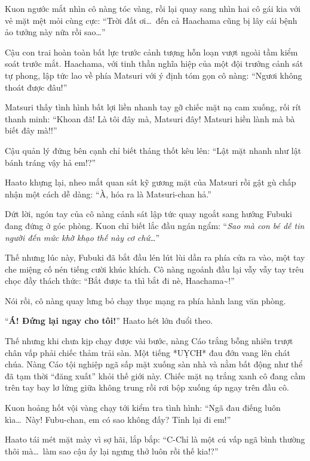 \documentclass[../main.tex]{subfiles}
\begin{document}
Kuon ngước mắt nhìn cô nàng tóc vàng, rồi lại quay sang nhìn hai cô gái kia với vẻ mặt mệt mỏi cùng cực: ``Trời đất ơi\dots\ đến cả Haachama cũng bị lây cái bệnh ảo tưởng này nữa rồi sao\dots''


Cậu con trai hoàn toàn bất lực trước cảnh tượng hỗn loạn vượt ngoài tầm kiểm soát trước mắt. Haachama, với tinh thần nghĩa hiệp của một đội trưởng cảnh sát tự phong, lập tức lao về phía Matsuri với ý định tóm gọn cô nàng:
``Ngươi không thoát được đâu!''

Matsuri thấy tình hình bất lợi liền nhanh tay gỡ chiếc mặt nạ cam xuống, rối rít thanh minh:
``Khoan đã! Là tôi đây mà, Matsuri đây! Matsuri hiền lành mà bà biết đây mà!!''

Cậu quản lý đứng bên cạnh chỉ biết thảng thốt kêu lên:
``Lật mặt nhanh như lật bánh tráng vậy hả em!?''

Haato khựng lại, nheo mắt quan sát kỹ gương mặt của Matsuri rồi gật gù chấp nhận một cách dễ dàng:
``À, hóa ra là Matsuri-chan hả.''

Dứt lời, ngón tay của cô nàng cảnh sát lập tức quay ngoắt sang hướng Fubuki đang đứng ở góc phòng. Kuon chỉ biết lắc đầu ngán ngẩm: ``\textit{Sao mà con bé dễ tin người đến mức khờ khạo thế này cơ chứ\dots}''


Thế nhưng lúc này, Fubuki đã bắt đầu lén lút lùi dần ra phía cửa ra vào, một tay che miệng cố nén tiếng cười khúc khích. Cô nàng ngoảnh đầu lại vẫy vẫy tay trêu chọc đầy thách thức:
``Bắt được ta thì bắt đi nè, Haachama\~{}!''

Nói rồi, cô nàng quay lưng bỏ chạy thục mạng ra phía hành lang văn phòng.

``\textbf{Á! Đứng lại ngay cho tôi!}'' Haato hét lớn đuổi theo.

Thế nhưng khi chưa kịp chạy được vài bước, nàng Cáo trắng bỗng nhiên trượt chân vấp phải chiếc thảm trải sàn. Một tiếng *UỴCH* đau đớn vang lên chát chúa. Nàng Cáo tội nghiệp ngã sấp mặt xuống sàn nhà và nằm bất động như thể đã tạm thời ``đăng xuất'' khỏi thế giới này. Chiếc mặt nạ trắng xanh cô đang cầm trên tay bay lơ lửng giữa không trung rồi rơi bộp xuống úp ngay trên đầu cô.


Kuon hoảng hốt vội vàng chạy tới kiểm tra tình hình:
``Ngã đau điếng luôn kìa\dots\ Này! Fubu-chan, em có sao không đấy? Tỉnh lại đi em!''

Haato tái mét mặt mày vì sợ hãi, lắp bắp:
``C-Chỉ là một cú vấp ngã bình thường thôi mà\dots\ làm sao cậu ấy lại ngưng thở luôn rồi thế kia!?''
\end{document}
